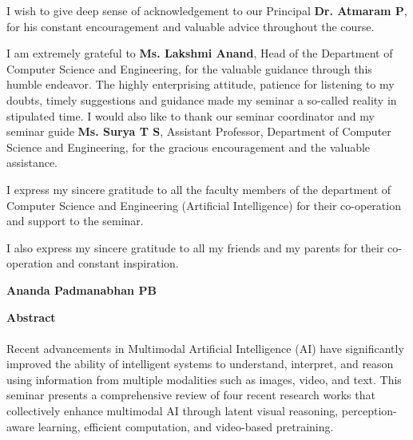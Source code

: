 \documentclass[12pt,a4paper,final]{extreport}
\begin{document}
I wish to give deep sense of acknowledgement to our Principal \textbf{Dr. Atmaram P}, for his constant encouragement and valuable advice throughout the course.

I am extremely grateful to \textbf{Ms. Lakshmi Anand}, Head of the Department of Computer Science and Engineering, for the valuable guidance through this humble endeavor. The highly enterprising attitude, patience for listening to my doubts, timely suggestions and guidance made my seminar a so-called reality in stipulated time.
I would also like to thank our seminar coordinator and my seminar guide \textbf{Ms. Surya T S}, Assistant Professor, Department of Computer Science and Engineering, for the gracious encouragement and the valuable assistance.

I express my sincere gratitude to all the faculty members of the department of Computer Science and Engineering (Artificial Intelligence) for their co-operation and support to the seminar.

I also express my sincere gratitude to all my friends and my parents for their co-operation and constant inspiration.

\vspace{2cm}
\noindent\hfill
\begin{minipage}[t]{0.4\textwidth}
\centering
\textbf{Ananda Padmanabhan PB}
\end{minipage}

\newpage

\begin{center}
\begin{huge}
\textbf{Abstract}
\end{huge}
\end{center}

\vskip0.3cm

\begingroup
{}
\paragraph{} Recent advancements in Multimodal Artificial Intelligence (AI) have significantly improved the ability of intelligent systems to understand, interpret, and reason using information from multiple modalities such as images, video, and text. This seminar presents a comprehensive review of four recent research works that collectively enhance multimodal AI through latent visual reasoning, perception-aware learning, efficient computation, and video-based pretraining.
\end{document}
